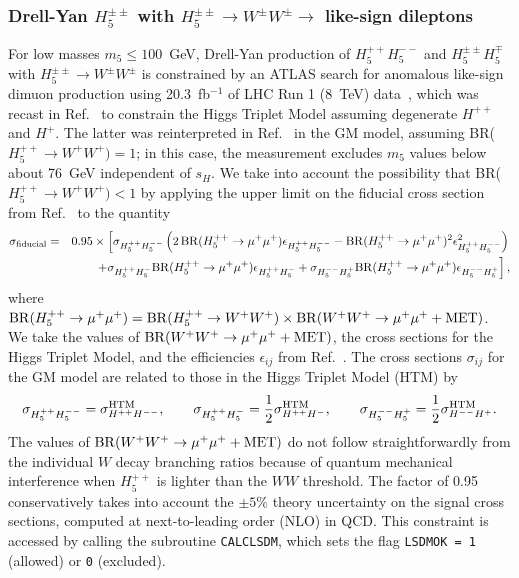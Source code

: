 \documentclass[11pt]{article}
\begin{document}
\subsubsection{Drell-Yan $H_5^{\pm\pm}$ with $H_5^{\pm\pm} \to W^{\pm}W^{\pm} \to$ like-sign dileptons}

For low masses $m_5 \leq 100$~GeV, Drell-Yan production of $H_5^{++}H_5^{--}$ and $H_5^{\pm\pm} H_5^{\mp}$ with $H_5^{\pm\pm} \to W^{\pm} W^{\pm}$ is constrained by an ATLAS search for anomalous like-sign dimuon production using 20.3~fb$^{-1}$ of LHC Run 1 (8~TeV) data~\cite{ATLAS:2014kca}, which was recast in Ref.~\cite{Kanemura:2014ipa} to constrain the Higgs Triplet Model assuming degenerate $H^{++}$ and $H^+$.  The latter was reinterpreted in Ref.~\cite{Logan:2015xpa} in the GM model, assuming BR($H_5^{++} \to W^+W^+) = 1$; in this case, the measurement excludes $m_5$ values below about 76~GeV independent of $s_H$.  We take into account the possibility that BR($H_5^{++} \to W^+W^+) < 1$ by applying the upper limit on the fiducial cross section from Ref.~\cite{ATLAS:2014kca} to the quantity
\begin{eqnarray}
	\sigma_{\rm fiducial} &=& 0.95 \times \left[ \sigma_{H_5^{++}H_5^{--}} 
	\left( 2 \, {\rm BR}(H_5^{++} \to \mu^+ \mu^+) \epsilon_{H_5^{++}H_5^{--}} 
	- {\rm BR}(H_5^{++} \to \mu^+ \mu^+)^2 \epsilon_{H_5^{++}H_5^{--}}^2 \right) \right. \nonumber \\
	&& \left. + \sigma_{H_5^{++} H_5^-} {\rm BR}(H_5^{++} \to \mu^+ \mu^+) \epsilon_{H_5^{++}H_5^-}
	+ \sigma_{H_5^{--} H_5^+} {\rm BR}(H_5^{++} \to \mu^+ \mu^+) \epsilon_{H_5^{--}H_5^+}
	\right],
\end{eqnarray}
where ${\rm BR}(H_5^{++} \to \mu^+ \mu^+) = {\rm BR}(H_5^{++} \to W^+W^+) \times {\rm BR}(W^+W^+ \to \mu^+\mu^+ + {\rm MET})$.  We take the values of ${\rm BR}(W^+W^+ \to \mu^+\mu^+ + {\rm MET})$, the cross sections for the Higgs Triplet Model, and the efficiencies $\epsilon_{ij}$ from Ref.~\cite{Kanemura:2014ipa}.  The cross sections $\sigma_{ij}$ for the GM model are related to those in the Higgs Triplet Model (HTM) by~\cite{Logan:2015xpa}
\begin{equation}
	\sigma_{H_5^{++}H_5^{--}} = \sigma_{H^{++}H^{--}}^{\rm HTM}, \qquad
	\sigma_{H_5^{++}H_5^-} = \frac{1}{2} \sigma_{H^{++}H^-}^{\rm HTM}, \qquad
	\sigma_{H_5^{--}H_5^+} = \frac{1}{2} \sigma_{H^{--}H^+}^{\rm HTM}.
\end{equation} 
The values of ${\rm BR}(W^+W^+ \to \mu^+\mu^+ + {\rm MET})$ do not follow straightforwardly from the individual $W$ decay branching ratios because of quantum mechanical interference when $H_5^{++}$ is lighter than the $WW$ threshold.
The factor of 0.95 conservatively takes into account the $\pm 5\%$ theory uncertainty on the signal cross sections, computed at next-to-leading order (NLO) in QCD.
This constraint is accessed by calling the subroutine {\tt CALCLSDM}, which sets the flag {\tt LSDMOK = 1} (allowed) or {\tt 0} (excluded).
\end{document}
